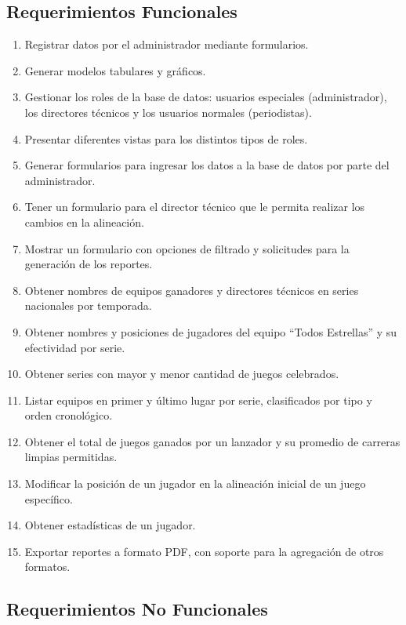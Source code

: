 \documentclass{report}
\begin{document}
    \subsection*{Requerimientos Funcionales}
    \begin{enumerate}
        \item Registrar datos por el administrador mediante formularios.
        \item Generar modelos tabulares y gr\'aficos.
        \item Gestionar los roles de la base de datos: usuarios especiales (administrador), los directores técnicos y 
        los usuarios normales (periodistas).
        \item Presentar diferentes vistas para los distintos tipos de roles.
        \item Generar formularios para ingresar los datos a la base de datos por parte del administrador.
        \item Tener un formulario para el director técnico que le permita realizar los cambios en la alineación.
        \item Mostrar un formulario con opciones de filtrado y solicitudes para la generaci\'on de los reportes.
        \item Obtener nombres de equipos ganadores y directores técnicos en series nacionales por temporada.
        \item Obtener nombres y posiciones de jugadores del equipo ``Todos Estrellas'' y su efectividad por serie.
        \item Obtener series con mayor y menor cantidad de juegos celebrados.
        \item Listar equipos en primer y último lugar por serie, clasificados por tipo y orden cronológico.
        \item Obtener el total de juegos ganados por un lanzador y su promedio de carreras limpias permitidas.
        \item Modificar la posición de un jugador en la alineación inicial de un juego específico.
        \item Obtener estadísticas de un jugador.
        \item Exportar reportes a formato PDF, con soporte para la agregación de otros formatos.
    \end{enumerate}

    \subsection*{Requerimientos No Funcionales}
\end{document}
